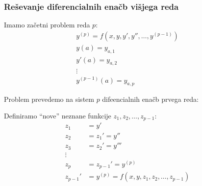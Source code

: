 \documentclass[a4paper,12pt]{article}
\theoremstyle{definition}
\theoremstyle{remark}
\begin{document}
\subsubsection{Reševanje diferencialnih enačb višjega reda}
Imamo začetni problem reda $p$:
\begin{gather*}
    y^{(p)} = f(x, y, y', y'', \dots, y^{(p-1)}) \\
    y(a) = y_{a, 1} \\
    y'(a) = y_{a, 2} \\
    \vdots \\
    y^{(p-1)}(a) = y_{a, p}
\end{gather*}

Problem prevedemo na sistem $p$ difeencialnih enačb prvega reda:

Definiramo ``nove'' neznane funkcije $z_1, z_2, \dots, z_{p-1}$:
\begin{align*}
    z_1 &= y'\\
    z_2 &= z_1' = y'' \\
    z_3 &= z_2' = y''' \\
    \vdots \\
    z_{p} &= z_{p-1}' = y^{(p)} \\
    z_{p-1}' &= y^{(p)} = f(x, y, z_1, z_2, \dots, z_{p-1})
\end{align*}
\end{document}
